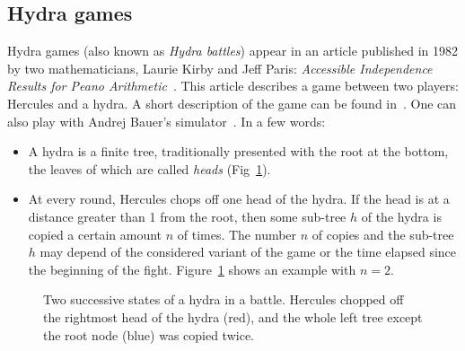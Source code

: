 \documentclass{easychair}
\begin{document}
\subsection{Hydra games}
Hydra games (also known as \emph{Hydra battles}) appear in an article published in 1982 by two mathematicians, 
Laurie Kirby and Jeff Paris: \emph{Accessible Independence Results for Peano Arithmetic}~\cite{KP82}.
This article describes a game between two players: Hercules and a hydra.
A short description of the game  can be found in~\cite{bauer2008, KP82, JFLA2018paper}. One can also play with
Andrej Bauer's simulator~\cite{BauerHydra}.
In a few words:
\begin{itemize}
\item A hydra is a finite tree, traditionally presented with the root at the bottom, the leaves of which are called \emph{heads}
  (Fig~\ref{fig:round}).
\item At every round, Hercules chops off one head of the hydra. If the head is at a distance greater than 1 from the root,
  then some sub-tree $h$ of the hydra is copied a certain amount $n$ of times. The number $n$ of copies and the sub-tree $h$ may depend of the considered variant of the game
  or the time elapsed since the beginning of the fight.
  Figure~\ref{fig:round} shows an example with $n=2$.
\end{itemize}



\begin{figure}[h]
  \centering

  \caption{Two successive states of a hydra in a battle.  Hercules chopped off the rightmost head of the hydra (red), and the whole left tree except the root node (blue) was copied twice.}
  \label{fig:round}
\end{figure}
\end{document}
